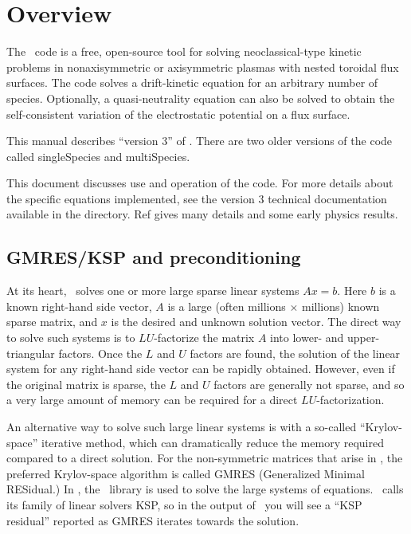 \chapter{Overview}


The \sfincs~code is a free, open-source tool for solving neoclassical-type kinetic problems in nonaxisymmetric or axisymmetric plasmas
with nested toroidal flux surfaces.
The code solves a drift-kinetic equation for an arbitrary number of species.  Optionally, a quasi-neutrality
equation can also be solved to obtain the self-consistent variation of the electrostatic potential on a flux surface.

This manual describes ``version 3'' of \sfincs.  There are two older versions of the
code called singleSpecies and multiSpecies.

This document discusses use and operation of the code.  For more details about the specific equations implemented,
see the version 3 technical documentation available in the  directory.
Ref \cite{sfincsPaper} gives many details and some early physics results.



\section{GMRES/KSP and preconditioning}

At its heart, \sfincs~solves one or more large sparse linear systems $Ax=b$.  Here $b$ is a known right-hand side vector,
$A$ is a large (often millions $\times$ millions) known sparse matrix, and $x$ is the desired and unknown solution vector.
The direct way to solve such systems is to $LU$-factorize
the matrix $A$ into lower- and upper-triangular factors.
Once the $L$ and $U$ factors are found, the solution of the linear system
for any right-hand side vector can be rapidly obtained.  However, even if the original matrix is sparse, the $L$ and $U$ factors
are generally not sparse, and so a very large amount of memory can be required for a direct $LU$-factorization.

An alternative way to solve
such large linear systems is with a so-called ``Krylov-space'' iterative method, which can dramatically reduce the memory required
compared to a direct solution.  For the non-symmetric matrices that arise in \sfincs, the preferred Krylov-space
algorithm is called GMRES (Generalized Minimal RESidual.)  In \sfincs, the \PETSc~library is used to solve the large systems
of equations. \PETSc~calls its family of linear solvers KSP, so in the output of \sfincs~you will see a ``KSP residual'' reported
as GMRES iterates towards the solution.

